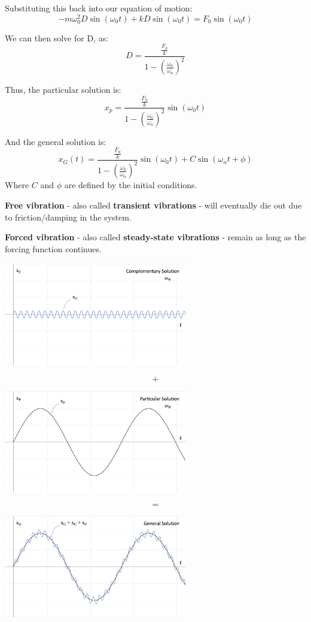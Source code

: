 \documentclass[12pt,letterpaper,twoside]{report}
\begin{document}
Substituting this back into our equation of motion:
\[
-m \omega_0^2 D \sin (\omega_0 t) + k D \sin (\omega_0 t) = F_0 \sin ( \omega_0 t)
\]

We can then solve for D, as:
\[
\displaystyle D = \frac{\displaystyle \frac{F_0}{k}}{1- \left( \displaystyle \frac{\omega_0}{\omega_n} \right)^2}
\]

Thus, the particular solution is:
\[
x_p = \frac{\displaystyle \frac{F_0}{k}}{1- \left( \displaystyle \frac{\omega_0}{\omega_n} \right)^2} \sin ( \omega_0 t)
\]

And the general solution is: 
\[
x_G(t) = \frac{\displaystyle \frac{F_0}{k}}{1- \left( \displaystyle \frac{\omega_0}{\omega_n} \right)^2} \sin ( \omega_0 t) + C \sin (\omega_n t + \phi)
\]
Where $C$ and $\phi$ are defined by the initial conditions.  
\vspace*{3\baselineskip}

\textbf{Free vibration} - also called \textbf{transient vibrations} - will eventually die out due to friction/damping in the system. 

\textbf{Forced vibration} - also called \textbf{steady-state vibrations} - remain as long as the forcing function continues.  

\newpage

\includegraphics[trim={0cm 1cm 0cm 0cm},clip,width=0.6\textwidth, center]{Slide84}
\begin{center}
\[+\]
\end{center}
\includegraphics[trim={0cm 1cm 0cm 0cm},clip,width=0.6\textwidth, center]{Slide85}
\begin{center}
\[=\]
\end{center}
\includegraphics[trim={0cm 1cm 0cm 0cm},clip,width=0.6\textwidth, center]{Slide86}
\newpage
\end{document}
